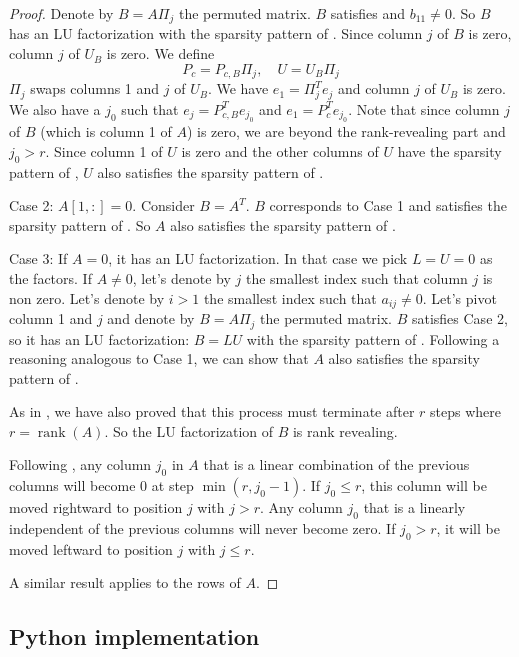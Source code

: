 \documentclass[10pt,twoside]{siamart1116}
\DeclareMathOperator{\rk}{rank}
\numberwithin{theorem}{section}
\begin{document}
\begin{proof}
	Denote by $B = A \Pi_j$ the permuted matrix. $B$ satisfies  and $b_{11} \neq 0$. So $B$ has an LU factorization with the sparsity pattern of . Since column $j$ of $B$ is zero, column $j$ of $U_{B}$ is zero. We define
	\[ P_c = P_{c,B} \Pi_j, \quad U = U_B \Pi_j \]
	$\Pi_j$ swaps columns 1 and $j$ of $U_{B}$. We have $e_1 = \Pi_j^T e_j$ and column $j$ of $U_{B}$ is zero. We also have a $j_0$ such that $e_j = P_{c,B}^T e_{j_0}$ and $e_1 = P_c^T e_{j_0}$. Note that since column $j$ of $B$ (which is column 1 of $A$) is zero, we are beyond the rank-revealing part and $j_0 > r$. Since column 1 of $U$ is zero and the other columns of $U$ have the sparsity pattern of , $U$ also satisfies the sparsity pattern of .

	Case 2: $A[1,:] = 0$. Consider $B = A^T$. $B$ corresponds to Case 1 and satisfies the sparsity pattern of . So $A$ also satisfies the sparsity pattern of .

	Case 3: If $A = 0$, it has an LU factorization. In that case we pick $L=U=0$ as the factors. If $A \neq 0$, let's denote by $j$ the smallest index such that column $j$ is non zero. Let's denote by $i > 1$ the smallest index such that $a_{ij} \neq 0$. Let's pivot column 1 and $j$ and denote by $B = A \Pi_j$ the permuted matrix. $B$ satisfies Case 2, so it has an LU factorization: $B = L U$ with the sparsity pattern of . Following a reasoning analogous to Case 1, we can show that $A$ also satisfies the sparsity pattern of .

	As in , we have also proved that this process must terminate after $r$ steps where $r = \rk(A)$. So the LU factorization of $B$ is rank revealing.

	Following , any column $j_0$ in $A$ that is a linear combination of the previous columns will become 0 at step $\min(r,j_0-1)$. If $j_0 \le r$, this column will be moved rightward to position $j$ with $j > r$. Any column $j_0$ that is a linearly independent of the previous columns will never become zero. If $j_0 > r$, it will be moved leftward to position $j$ with $j \le r$.

	A similar result applies to the rows of $A$.
\end{proof}

\subsection{Python implementation}
\end{document}

